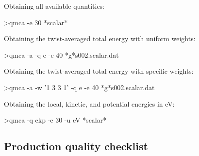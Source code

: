 \noindent
Obtaining all available quantities:
\begin{shade}
>qmca -e 30 *scalar*
\end{shade}
\noindent
Obtaining the twist-averaged total energy with uniform weights:
\begin{shade}
>qmca -a -q e -e 40 *g*s002.scalar.dat
\end{shade}
\noindent
Obtaining the twist-averaged total energy with specific weights:
\begin{shade}
>qmca -a -w '1 3 3 1' -q e -e 40 *g*s002.scalar.dat
\end{shade}
\noindent
Obtaining the local, kinetic, and potential energies in eV:
\begin{shade}
>qmca -q ekp -e 30 -u eV *scalar*
\end{shade}



\subsection{Production quality checklist}
\label{sec:qmca_production_checklist}

